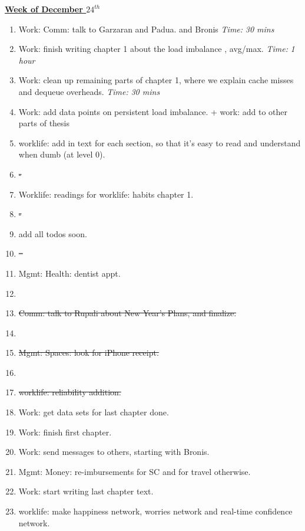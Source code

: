 \documentclass[11pt]{article}
\newcommand{\doneTask}[1]{\item \sout{#1}}
\newcommand{\timeEst}[1]{\textit{Time:} \textit{#1}}
\begin{document}
      {\small \underline{\textbf{Week of December $24^{th}$}} }
      \begin{enumerate}
 
      \item \tiny Work: Comm: talk to Garzaran and Padua. and Bronis \timeEst{30 mins} 
      \item \tiny Work: finish writing chapter 1 about the load imbalance , avg/max.  \timeEst{1 hour} 
      \item \tiny Work: clean up remaining parts of chapter 1, where we explain cache misses and dequeue overheads.  \timeEst{30 mins} 
      \item \tiny Work: add data points on persistent load imbalance. + work: add to other parts of thesis
        
      \item \tiny worklife: add in text for each section, so that it's easy to read and understand when dumb (at level 0). \doneTask{-} 
      \item \tiny Worklife: readings for worklife: habits chapter 1.  \doneTask{-} 
      \item \tiny add all todos soon.  \doneTask{ --  } 
      \item \tiny Mgmt: Health: dentist appt. 
      \item \tiny \doneTask{Comm: talk to Rupali about New Year's Plans, and finalize.} 
      \item \tiny \doneTask{Mgmt: Spaces: look for iPhone receipt.}  
      \item \tiny \doneTask{worklife: reliability addition.}   
      \item \tiny Work: get data sets for last chapter done. 
      \item \tiny Work: finish first chapter. 
      \item \tiny Work: send messages to others, starting with Bronis.  
      \item \tiny Mgmt: Money: re-imbursements for SC and for travel otherwise.  
      \item \tiny Work: start writing last chapter text. 
        \item \tiny worklife: make happiness network, worries network and real-time confidence network. 
      \end{enumerate}
      \newpage
\end{document}
